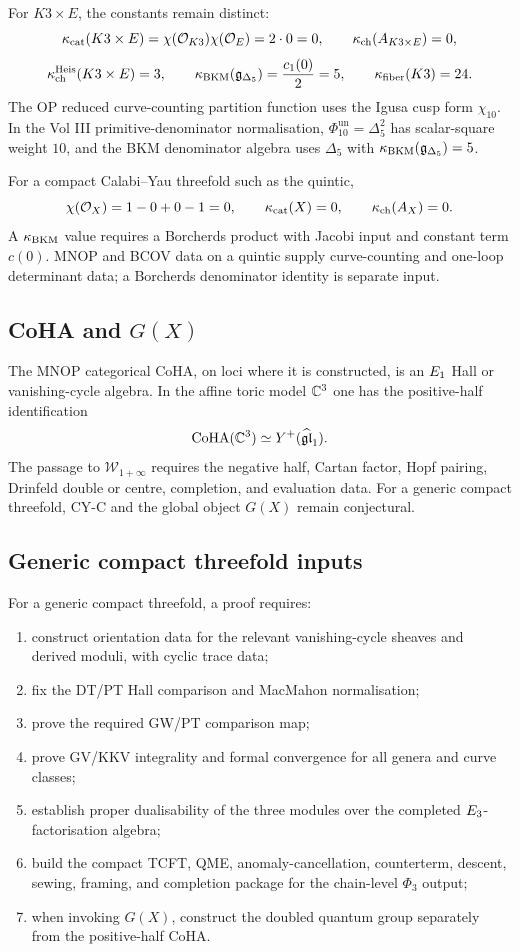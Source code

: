 For \(K3\times E\), the constants remain distinct:
\[
  \kappa_{\mathrm{cat}}(K3\times E)=\chi(\mathcal{O}_{K3})\chi(\mathcal{O}_E)=2\cdot 0=0,
  \qquad
  \kappa_{\mathrm{ch}}(A_{K3\times E})=0,
\]
\[
  \kappa_{\mathrm{ch}}^{\mathrm{Heis}}(K3\times E)=3,\qquad
  \kappa_{\mathrm{BKM}}(\mathfrak g_{\Delta_5})=\frac{c_1(0)}{2}=5,\qquad
  \kappa_{\mathrm{fiber}}(K3)=24.
\]
The OP reduced curve-counting partition function uses the Igusa cusp
form \(\chi_{10}\).  In the Vol III primitive-denominator
normalisation, \(\Phi_{10}^{\mathrm{un}}=\Delta_5^2\) has scalar-square
weight \(10\), and the BKM denominator algebra uses \(\Delta_5\) with
\(\kappa_{\mathrm{BKM}}(\mathfrak g_{\Delta_5})=5\).

For a compact Calabi--Yau threefold such as the quintic,
\[
  \chi(\mathcal{O}_X)=1-0+0-1=0,\qquad
  \kappa_{\mathrm{cat}}(X)=0,\qquad
  \kappa_{\mathrm{ch}}(A_X)=0.
\]
A \(\kappa_{\mathrm{BKM}}\) value requires a Borcherds product with Jacobi input and
constant term \(c(0)\).  MNOP and BCOV data on a quintic supply
curve-counting and one-loop determinant data; a Borcherds denominator
identity is separate input.

\subsection{CoHA and \(G(X)\)}

The MNOP categorical CoHA, on loci where it is constructed, is an
\(E_1\) Hall or vanishing-cycle algebra.  In the affine toric model
\(\mathbb{C}^3\) one has the positive-half identification
\[
  \mathrm{CoHA}(\mathbb{C}^3)\simeq Y^+(\widehat{\mathfrak{gl}}_1).
\]
The passage to \(\mathcal W_{1+\infty}\) requires the negative half,
Cartan factor, Hopf pairing, Drinfeld double or centre, completion, and
evaluation data.  For a generic compact threefold, CY-C and the global
object \(G(X)\) remain conjectural.

\subsection{Generic compact threefold inputs}

For a generic compact threefold, a proof requires:
\begin{enumerate}
\item construct orientation data for the relevant vanishing-cycle
  sheaves and derived moduli, with cyclic trace data;
\item fix the DT/PT Hall comparison and MacMahon normalisation;
\item prove the required GW/PT comparison map;
\item prove GV/KKV integrality and formal convergence for all
  genera and curve classes;
\item establish proper dualisability of the three modules over the
  completed \(E_3\)-factorisation algebra;
\item build the compact TCFT, QME, anomaly-cancellation, counterterm,
  descent, sewing, framing, and completion package for the chain-level
  \(\Phi_3\) output;
\item when invoking \(G(X)\), construct the doubled quantum group
  separately from the positive-half CoHA.
\end{enumerate}

